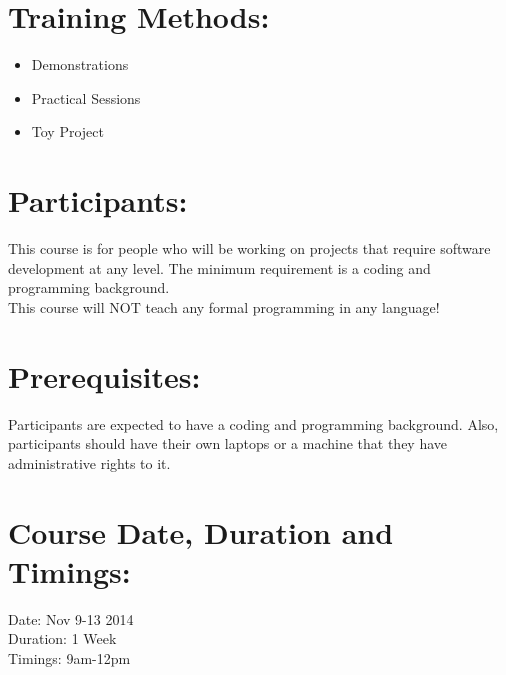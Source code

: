 \documentclass[a4paper,11pt]{article}
\begin{document}
\section{Training Methods:}
\begin{itemize}
	\item Demonstrations
	\item Practical Sessions
	\item Toy Project
\end{itemize}

\section{Participants:}
This course is for people who will be working on projects that require software development at any level.  The minimum requirement is a coding and programming background.\\
This course will NOT teach any formal programming in any language!

\section{Prerequisites:}
Participants are expected to have a coding and programming background. Also, participants should have their own laptops or a machine that they have administrative rights to it.

\section{Course Date, Duration and Timings:}
Date: Nov 9-13 2014\\
Duration: 1 Week\\
Timings: 9am-12pm
\end{document}
